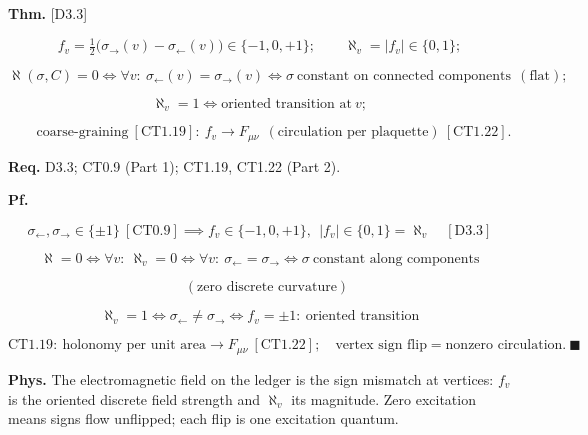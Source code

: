 \begin{theorem}\label{tag:EM-12}
\textbf{Thm.} [D3.3]

\[
f_v=\tfrac12\bigl(\sigma_{\rightarrow}(v)-\sigma_{\leftarrow}(v)\bigr)\in\{-1,0,+1\};\qquad\aleph_v=|f_v|\in\{0,1\};
\]

\[
\aleph(\sigma,C)=0\iff\forall v:\ \sigma_{\leftarrow}(v)=\sigma_{\rightarrow}(v)\iff\sigma\ \text{constant on connected components}\ \ (\text{flat});
\]

\[
\aleph_v=1\iff\text{oriented transition at}\ v;
\]

\[
\qquad \text{coarse-graining}\ [\mathrm{CT1.19}]:\ f_v\longrightarrow F_{\mu\nu}\ \ (\text{circulation per plaquette})\ [\mathrm{CT1.22}].
\]

\textbf{Req.} D3.3; CT0.9 (Part 1); CT1.19, CT1.22 (Part 2).

\textbf{Pf.}

\[
\sigma_{\leftarrow},\sigma_{\rightarrow}\in\{\pm1\}\ [\mathrm{CT0.9}]\implies f_v\in\{-1,0,+1\},\ \ |f_v|\in\{0,1\}=\aleph_v\quad[\mathrm{D3.3}]
\]

\[
\aleph=0\iff\forall v:\ \aleph_v=0\iff\forall v:\ \sigma_{\leftarrow}=\sigma_{\rightarrow}\iff\sigma\ \text{constant along components}
\]

\[
\quad (\text{zero discrete curvature})
\]

\[
\aleph_v=1\iff\sigma_{\leftarrow}\ne\sigma_{\rightarrow}\iff f_v=\pm1:\ \text{oriented transition}
\]

\[
\mathrm{CT1.19}:\ \text{holonomy per unit area}\to F_{\mu\nu}\ [\mathrm{CT1.22}];\quad\text{vertex sign flip}=\text{nonzero circulation}.\ \blacksquare
\]

\textbf{Phys.} The electromagnetic field on the ledger is the sign mismatch at vertices: $f_v$ is the oriented discrete field strength and $\aleph_v$ its magnitude. Zero excitation means signs flow unflipped; each flip is one excitation quantum.

\end{theorem}

